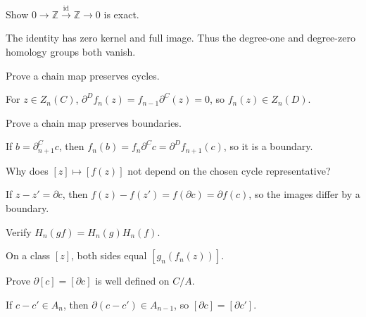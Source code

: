 \begin{problem}\label{prob:viii16-05}
Show \(0\to\mathbb Z\xrightarrow{\operatorname{id}}\mathbb Z\to0\) is exact.
\end{problem}
\begin{solution}
The identity has zero kernel and full image. Thus the degree-one and degree-zero homology groups both vanish.
\end{solution}

\begin{problem}\label{prob:viii16-06}
Prove a chain map preserves cycles.
\end{problem}
\begin{solution}
For \(z\in Z_n(C)\), \(\partial^Df_n(z)=f_{n-1}\partial^C(z)=0\), so \(f_n(z)\in Z_n(D)\).
\end{solution}

\begin{problem}\label{prob:viii16-07}
Prove a chain map preserves boundaries.
\end{problem}
\begin{solution}
If \(b=\partial^C_{n+1}c\), then \(f_n(b)=f_n\partial^C c=\partial^D f_{n+1}(c)\), so it is a boundary.
\end{solution}

\begin{problem}\label{prob:viii16-08}
Why does \([z]\mapsto[f(z)]\) not depend on the chosen cycle representative?
\end{problem}
\begin{solution}
If \(z-z'=\partial c\), then \(f(z)-f(z')=f(\partial c)=\partial f(c)\), so the images differ by a boundary.
\end{solution}

\begin{problem}\label{prob:viii16-09}
Verify \(H_n(gf)=H_n(g)H_n(f)\).
\end{problem}
\begin{solution}
On a class \([z]\), both sides equal \([g_n(f_n(z))]\).
\end{solution}

\begin{problem}\label{prob:viii16-10}
Prove \(\partial[c]=[\partial c]\) is well defined on \(C/A\).
\end{problem}
\begin{solution}
If \(c-c'\in A_n\), then \(\partial(c-c')\in A_{n-1}\), so \([\partial c]=[\partial c']\).
\end{solution}

